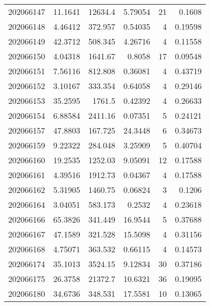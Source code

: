 \begin{tabular}{rrrrrr}
 202066147 &         11.1641  &    12634.4    &            5.79054 &          21 & 0.1608  \\
 202066148 &          4.46412 &      372.957  &            0.54035 &           4 & 0.19598 \\
 202066149 &         42.3712  &      508.345  &            4.26716 &           4 & 0.11558 \\
 202066150 &          4.04318 &     1641.67   &            0.8058  &          17 & 0.09548 \\
 202066151 &          7.56116 &      812.808  &            0.36081 &           4 & 0.43719 \\
 202066152 &          3.10167 &      333.354  &            0.64058 &           4 & 0.29146 \\
 202066153 &         35.2595  &     1761.5    &            0.42392 &           4 & 0.26633 \\
 202066154 &          6.88584 &     2411.16   &            0.07351 &           5 & 0.24121 \\
 202066157 &         47.8803  &      167.725  &           24.3448  &           6 & 0.34673 \\
 202066159 &          9.22322 &      284.048  &            3.25909 &           5 & 0.40704 \\
 202066160 &         19.2535  &     1252.03   &            9.05091 &          12 & 0.17588 \\
 202066161 &          4.39516 &     1912.73   &            0.04367 &           4 & 0.17588 \\
 202066162 &          5.31905 &     1460.75   &            0.06824 &           3 & 0.1206  \\
 202066164 &          3.04051 &      583.173  &            0.2532  &           4 & 0.23618 \\
 202066166 &         65.3826  &      341.449  &           16.9544  &           5 & 0.37688 \\
 202066167 &         47.1589  &      321.528  &           15.5098  &           4 & 0.31156 \\
 202066168 &          4.75071 &      363.532  &            0.66115 &           4 & 0.14573 \\
 202066174 &         35.1013  &     3524.15   &            9.12834 &          30 & 0.37186 \\
 202066175 &         26.3758  &    21372.7    &           10.6321  &          36 & 0.19095 \\
 202066180 &         34.6736  &      348.531  &           17.5581  &          10 & 0.13065 \\

\end{tabular}
